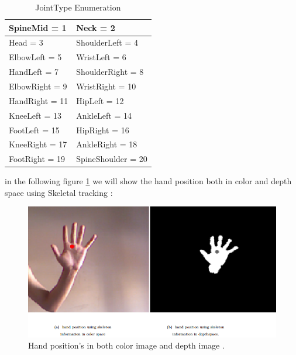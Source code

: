 \begin{table}[H]
\centering
\caption{JointType Enumeration}
 \label{table:t1} 
\begin{tabu} to 0.5\textwidth { | X[l] | X[r] | }

 \hline
 SpineMid = 1  & Neck = 2    \\
 \hline 
 Head = 3  &  ShoulderLeft = 4    \\
\hline
  ElbowLeft = 5   &  WristLeft = 6    \\
\hline

 HandLeft =	7  &   ShoulderRight = 8    \\
\hline
 
ElbowRight = 9  &  WristRight = 10   \\
\hline
 
 HandRight = 11  &  HipLeft = 12   \\
\hline
 
 KneeLeft = 13  &  AnkleLeft = 14   \\
\hline
 
FootLeft = 15  &  HipRight = 16   \\
\hline
 
 KneeRight = 17  & AnkleRight = 18     \\
\hline

FootRight = 19   & SpineShoulder = 20     \\

\hline

 \end{tabu}


 \end{table}

in the following figure \ref{fig:cam9} we will show the hand position both in color and depth space using Skeletal tracking  :

\begin{figure}[H]
\centering
\includegraphics[width= 1.0\textwidth]{img/colorvsdepth.PNG}

\caption {Hand position's in both color image and depth image .
\label{fig:cam9}}

\end{figure}

